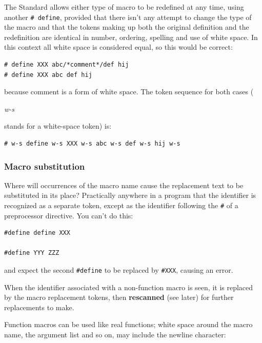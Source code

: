    The Standard allows either type of macro to be redefined at any time,
    using another \texttt{\# define}, provided that there isn't any
    attempt to change the type of the macro and that the tokens making up
    both the original definition and the redefinition are identical in
    number, ordering, spelling and use of white space. In this context all
    white space is considered equal, so this would be correct:


   \begin{Verbatim}
# define XXX abc/*comment*/def hij
# define XXX abc def hij
\end{Verbatim}

   because comment is a form of white space. The token sequence for both
    cases (\begin{center}\textit{w-s}\end{center}

 stands for a white-space token) is:


   \begin{Verbatim}
# w-s define w-s XXX w-s abc w-s def w-s hij w-s
\end{Verbatim}

   \subsubsection{Macro substitution}
    

    Where will occurrences of the macro name cause the replacement text
     to be substituted in its place? Practically anywhere in a program that
     the identifier is recognized as a separate token, except as the
     identifier following the \texttt{\#} of a preprocessor directive.
     You can't do this:


    \begin{Verbatim}
#define define XXX

#define YYY ZZZ
\end{Verbatim}

    and expect the second \texttt{\#define} to be replaced by
     \texttt{\#XXX}, causing an error.


    When the identifier associated with a non-function macro is seen, it
     is replaced by the macro replacement tokens, then \textbf{rescanned}
     (see later) for further replacements to make.


    Function macros can be used like real functions; white space around
     the macro name, the argument list and so on, may include the newline
     character:


